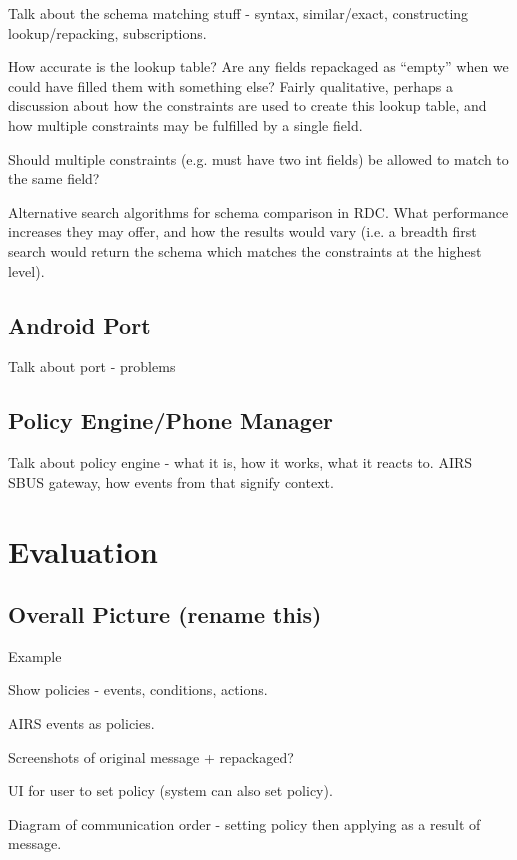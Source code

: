 \documentclass[12pt,twoside,notitlepage]{report}
\begin{document}
Talk about the schema matching stuff - syntax, similar/exact, constructing lookup/repacking, subscriptions.

How accurate is the lookup table? 
Are any fields repackaged as ``empty'' when we could have filled them with something else? 
Fairly qualitative, perhaps a discussion about how the constraints are used to create this lookup table, and how multiple constraints may be fulfilled by a single field.

Should multiple constraints (e.g. must have two int fields) be allowed to match to the same field?

Alternative search algorithms for schema comparison in RDC. 
What performance increases they may offer, and how the results would vary (i.e. a breadth first search would return the schema which matches the constraints at the highest level).

\section{Android Port}

Talk about port - problems

\section{Policy Engine/Phone Manager}

Talk about policy engine - what it is, how it works, what it reacts to. AIRS SBUS gateway, how events from that signify context.

\cleardoublepage


\chapter{Evaluation}

\section{Overall Picture (rename this)}

Example

Show policies - events, conditions, actions.

AIRS events as policies.

Screenshots of original message + repackaged?

UI for user to set policy (system can also set policy).

Diagram of communication order - setting policy then applying as a result of message.
\end{document}
